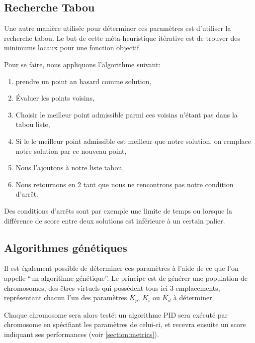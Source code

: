 \documentclass[a4paper,10pt]{report}
\begin{document}
\subsection{Recherche Tabou}

Une autre manière utilisée pour déterminer ces paramètres est d'utiliser la recherche tabou. Le but de cette méta-heuristique itérative est de trouver des minimums locaux pour une fonction objectif.

Pour se faire, nous appliquons l'algorithme suivant:
\begin{enumerate}
    \item prendre un point au hasard comme solution,
    \item Évaluer les points voisins,
    \item Choisir le meilleur point admissible parmi ces voisins n'étant pas dans la tabou liste,
    \item Si le le meilleur point admissible est meilleur que notre solution, on remplace notre solution par ce nouveau point,
    \item Nous l'ajoutons à notre liste tabou,
    \item Nous retournons en 2 tant que nous ne rencontrons pas notre condition d'arrêt.
\end{enumerate}

Des conditions d'arrêts sont par exemple une limite de temps ou lorsque la différence de score entre deux solutions est inférieure à un certain palier. \cite{glover2007principles}
\cite{bagis2011tabu}


\subsection{Algorithmes génétiques}
Il est également possible de déterminer ces paramètres à l'aide de ce que l'on appelle ``un algorithme génétique''.
Le principe est de générer une population de chromosomes, des êtres virtuels qui possèdent tous ici 3 emplacements, représentant chacun l'un des paramètres $K_p$, $K_i$ ou $K_d$ à déterminer.

Chaque chromosome sera alors testé: un algorithme PID sera exécuté par chromosome en spécifiant les paramètres de celui-ci, et recevra ensuite un score indiquant ses performances (voir \ref{section:metrics}).
\end{document}
